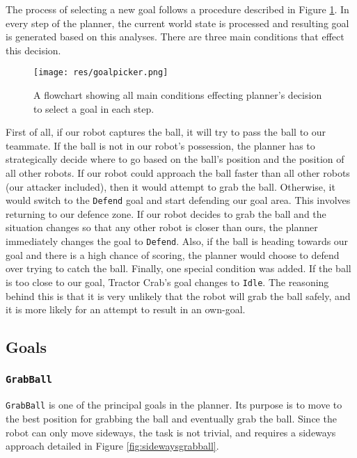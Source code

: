 The process of selecting a new goal follows a procedure described in Figure
\ref{fig:goalpicker}. In every step of the planner, the current world state is
processed and resulting goal is generated based on this analyses. There are
three main conditions that effect this decision.


\begin{figure}[H]
	\begin{center}
    \texttt{[image: res/goalpicker.png]}
    \caption{A flowchart showing all main conditions effecting planner's decision to select a goal in each step.}
    \label{fig:goalpicker}
	\end{center}
\end{figure}

\pagebreak

First of all, if our robot captures the ball, it will try to pass the ball to
our teammate. If the ball is not in our robot's possession, the planner
has to strategically decide where to go based on the ball's position and the
position of all other robots. If our robot could approach the ball faster than
all other robots (our attacker included), then it would attempt to grab the
ball. Otherwise, it would switch to the \texttt{Defend} goal and start
defending our goal area. This involves returning to our defence zone. If
our robot decides to grab the ball and the situation changes so that any
other robot is closer than ours, the planner immediately changes the goal to
\texttt{Defend}. Also, if the ball is heading towards our goal and there is a
high chance of scoring, the planner would choose to defend over trying to catch
the ball. Finally, one special condition was added. If the ball is too close to
our goal, Tractor Crab's goal changes to \texttt{Idle}. The reasoning behind
this is that it is very unlikely that the robot will grab the ball safely, and
it is more likely for an attempt to result in an own-goal.

\subsection{Goals}

\subsubsection{\texttt{GrabBall}}

\texttt{GrabBall} is one of the principal goals in the planner. Its purpose
is to move to the best position for grabbing the ball and eventually grab the
ball. Since the robot can only move sideways, the task is not trivial, and
requires a sideways approach detailed in Figure \ref{fig:sidewaysgrabball}.

